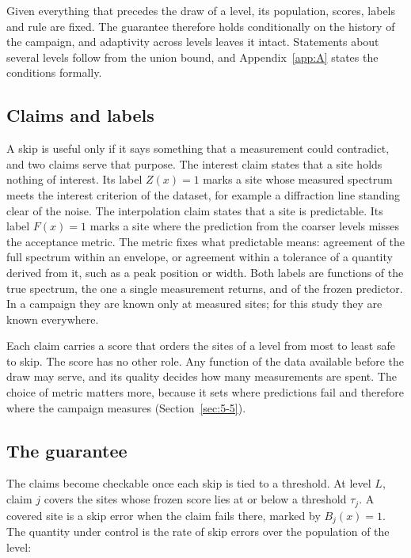 \documentclass{iopjournal}
\begin{document}
Given everything that precedes the draw of a level, its population, scores, labels and rule are fixed. The guarantee therefore holds conditionally on the history of the campaign, and adaptivity across levels leaves it intact. Statements about several levels follow from the union bound, and Appendix~\ref{app:A} states the conditions formally.

\hypertarget{sec:3-2}{%
\subsection{Claims and labels}\label{sec:3-2}}

A skip is useful only if it says something that a measurement could contradict, and two claims serve that purpose. The interest claim states that a site holds nothing of interest. Its label \(Z(x) = 1\) marks a site whose measured spectrum meets the interest criterion of the dataset, for example a diffraction line standing clear of the noise. The interpolation claim states that a site is predictable. Its label \(F(x) = 1\) marks a site where the prediction from the coarser levels misses the acceptance metric. The metric fixes what predictable means: agreement of the full spectrum within an envelope, or agreement within a tolerance of a quantity derived from it, such as a peak position or width. Both labels are functions of the true spectrum, the one a single measurement returns, and of the frozen predictor. In a campaign they are known only at measured sites; for this study they are known everywhere.

Each claim carries a score that orders the sites of a level from most to least safe to skip. The score has no other role. Any function of the data available before the draw may serve, and its quality decides how many measurements are spent. The choice of metric matters more, because it sets where predictions fail and therefore where the campaign measures (Section~\ref{sec:5-5}).

\hypertarget{sec:3-3}{%
\subsection{The guarantee}\label{sec:3-3}}

The claims become checkable once each skip is tied to a threshold. At level \(L\), claim \(j\) covers the sites whose frozen score lies at or below a threshold \(\tau_j\). A covered site is a skip error when the claim fails there, marked by \(B_j(x) = 1\). The quantity under control is the rate of skip errors over the population of the level:
\end{document}
